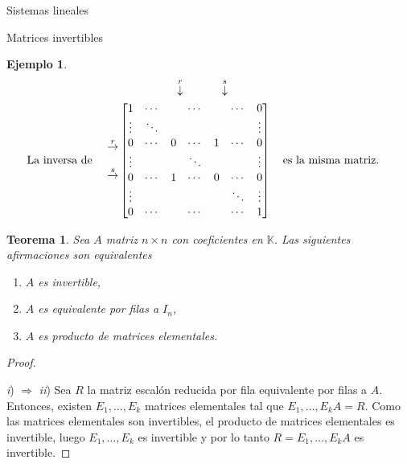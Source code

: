 \documentclass[a4paper,12pt,twoside,spanish]{amsbook}
\newtheorem{teorema}{Teorema}[section]
\theoremstyle{definition}
\newtheorem{ejemplo}{Ejemplo}[section]
\theoremstyle{remark}
\newcommand{\K}{\mathbb K}
\begin{document}
\begin{chapter}{Sistemas lineales}
\begin{section}{Matrices invertibles}
\begin{ejemplo}
			\begin{align*}
			&\begin{matrix}
			{}^{}&{}^{}&{}^{}&{}^{}&{}^{}&\overset{r}{\downarrow}&{}^{}&{}^{}&{}^{}{}^{}\overset{s}{\downarrow}&{}^{}
			\end{matrix} \\
			\text{La inversa de \quad}\begin{matrix}
			{}^{}\\{}^{}\\
			\overset{r}{\to}\\
			{}^{}\\
			\overset{s}{\to}\\{}^{}\\
			{}^{}
			\end{matrix}
			&\begin{bmatrix}
			1 & \cdots &  &\cdots &&\cdots& 0  \\
			\vdots  & \ddots  & & &&& \vdots \\
			0 & \cdots &0 &\cdots&1&\cdots &0 \\
			\vdots  &   & &\ddots &&& \vdots \\
			0  & \cdots  &1 &\cdots &0& \cdots& 0 \\
			\vdots  &   & & &&\ddots& \vdots \\
			0  & \cdots  & &\cdots &&\cdots& 1
			\end{bmatrix}
			\text{\quad es la misma matriz.\quad}
			\end{align*}
		
						
		
	
\end{ejemplo}
		
		
			
			
			\begin{teorema}\label{mtrx-inv-equiv} Sea $A$ matriz $n \times n$ con coeficientes en $\K$. Las siguientes afirmaciones son equivalentes
				\begin{enumerate}
					\item[\textit{i})] $A$ es invertible,
					\item[\textit{ii})] $A$  es equivalente por filas a $I_n$, 
					\item[\textit{iii})] $A$ es producto de matrices elementales.
				\end{enumerate}
			\end{teorema}
			\begin{proof}
				\

				
				\textit{i}) $\Rightarrow$ \textit{ii})\; Sea $R$ la matriz escalón reducida por fila equivalente por filas a $A$. Entonces,  existen $E_1,\ldots,E_k$ matrices elementales tal que $E_1,\ldots,E_kA = R$. Como las matrices elementales son invertibles, el producto de matrices elementales es invertible, luego  $E_1,\ldots,E_k$ es invertible y por lo tanto $R=E_1,\ldots,E_kA$ es invertible. 
				

\end{proof}
\end{section}
\end{chapter}
\end{document}
